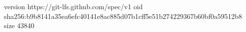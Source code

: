 version https://git-lfs.github.com/spec/v1
oid sha256:b9b8141a35ea6efc40141e8ac885d07b1cff5e51b274229367b60bf0a59512b8
size 43840
